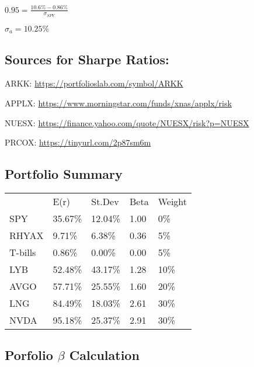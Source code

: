 \documentclass{article}
\begin{document}
\begin{center}
    \begin{math}
        0.95 = \frac{10.6\%-0.86\%}{\sigma_{SPY}}
    \end{math}
\end{center}

\begin{center}
    \begin{math}
        \sigma_{a} = 10.25\%
    \end{math}
\end{center}

\subsection{Sources for Sharpe Ratios:}

ARKK: \url{https://portfolioslab.com/symbol/ARKK}

APPLX: \url{https://www.morningstar.com/funds/xnas/applx/risk}

NUESX: \url{https://finance.yahoo.com/quote/NUESX/risk?p=NUESX}

PRCOX: \url{https://tinyurl.com/2p87sm6m}

\subsection{Portfolio Summary}

\begin{table} [H]
    \centering
    \begin{tabular}{lllll}
                 & E(r)    & St.Dev & Beta  & Weight  \\
        SPY      & 35.67\% & 12.04\% & 1.00  & 0\%     \\
        RHYAX    & 9.71\% & 6.38\% &  0.36 & 5\%    \\
        T-bills  & 0.86\%  & 0.00\% & 0.00  & 5\%    \\
        LYB      & 52.48\% & 43.17\% & 1.28  & 10\%    \\
        AVGO     & 57.71\% & 25.55\% & 1.60 & 20\%    \\
        LNG & 84.49\%  & 18.03\% & 2.61 & 30\%    \\
        NVDA     & 95.18\% & 25.37\% & 2.91  & 30\%   
    \end{tabular}
\end{table}

\subsection{Porfolio $\beta$ Calculation}
\end{document}
